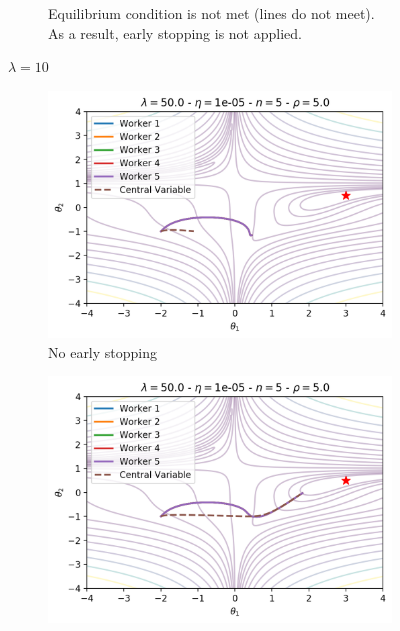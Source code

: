 \begin{figure}[H]
\begin{subfigure}{.45\textwidth}
    \caption{Equilibrium condition is not met (lines do not meet). As a result, early stopping is not applied.}
  \end{subfigure}
  \caption{$\lambda = 10$}
  \label{fig:easgd_sync_lambda_10}
\end{figure}

\begin{figure}[H]
  \centering
  \begin{subfigure}{.45\textwidth}
    \centering
    \includegraphics[width=\linewidth]{resources/images/easgd_es_50_n}
    \caption{No early stopping}
  \end{subfigure}
  \begin{subfigure}{.45\textwidth}
    \centering
    \includegraphics[width=\linewidth]{resources/images/easgd_es_50_y}

\end{subfigure}
\end{figure}
